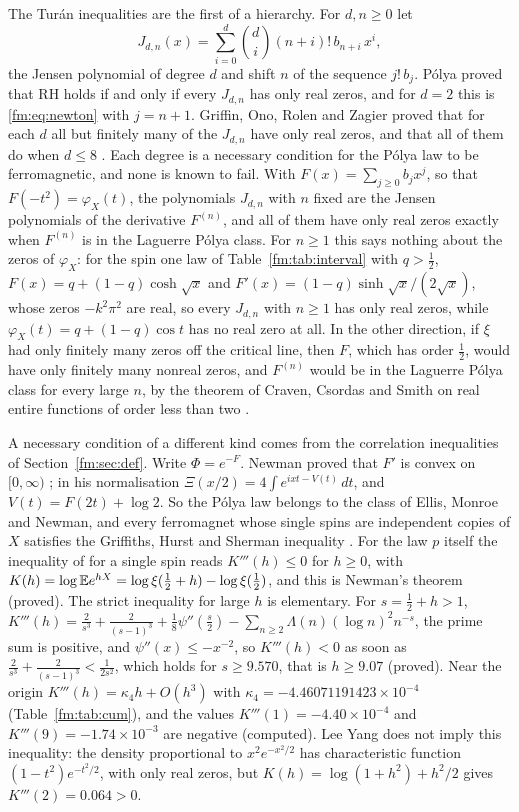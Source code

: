 The Tur\'an inequalities are the first of a hierarchy. For $d,n\ge0$ let
\[
J_{d,n}(x)=\sum_{i=0}^d\binom di(n+i)!\,b_{n+i}\,x^i,
\]
the Jensen polynomial of degree $d$ and shift $n$ of the sequence $j!\,b_j$. P\'olya proved that RH holds if and only if every $J_{d,n}$ has only real zeros, and for $d=2$ this is \eqref{fm:eq:newton} with $j=n+1$. Griffin, Ono, Rolen and Zagier proved that for each $d$ all but finitely many of the $J_{d,n}$ have only real zeros, and that all of them do when $d\le8$ \cite{GORZ19}. Each degree is a necessary condition for the P\'olya law to be ferromagnetic, and none is known to fail. With $F(x)=\sum_{j\ge0}b_jx^j$, so that $F(-t^2)=\varphi_X(t)$, the polynomials $J_{d,n}$ with $n$ fixed are the Jensen polynomials of the derivative $F^{(n)}$, and all of them have only real zeros exactly when $F^{(n)}$ is in the Laguerre P\'olya class. For $n\ge1$ this says nothing about the zeros of $\varphi_X$: for the spin one law of Table~\ref{fm:tab:interval} with $q>\frac12$, $F(x)=q+(1-q)\cosh\sqrt x$ and $F'(x)=(1-q)\sinh\sqrt x/(2\sqrt x)$, whose zeros $-k^2\pi^2$ are real, so every $J_{d,n}$ with $n\ge1$ has only real zeros, while $\varphi_X(t)=q+(1-q)\cos t$ has no real zero at all. In the other direction, if $\xi$ had only finitely many zeros off the critical line, then $F$, which has order $\frac12$, would have only finitely many nonreal zeros, and $F^{(n)}$ would be in the Laguerre P\'olya class for every large $n$, by the theorem of Craven, Csordas and Smith on real entire functions of order less than two \cite{CCS87}.

A necessary condition of a different kind comes from the correlation inequalities of Section~\ref{fm:sec:def}. Write $\Phi=e^{-F}$. Newman proved that $F'$ is convex on $[0,\infty)$ \cite{Newman91}; in his normalisation $\Xi(x/2)=4\int e^{ixt-V(t)}\,dt$, and $V(t)=F(2t)+\log2$. So the P\'olya law belongs to the class of Ellis, Monroe and Newman, and every ferromagnet whose single spins are independent copies of $X$ satisfies the Griffiths, Hurst and Sherman inequality \cite{EMN76}. For the law $p$ itself the inequality of \cite{EMN76} for a single spin reads $K'''(h)\le0$ for $h\ge0$, with $K(h)=\log\mathbb{E} e^{hX}=\log\xi(\frac12+h)-\log\xi(\frac12)$, and this is Newman's theorem \cite{Newman91} (proved). The strict inequality for large $h$ is elementary. For $s=\frac12+h>1$, $K'''(h)=\frac2{s^3}+\frac2{(s-1)^3}+\frac18\psi''(\frac s2)-\sum_{n\ge2}\Lambda(n)(\log n)^2n^{-s}$, the prime sum is positive, and $\psi''(x)\le-x^{-2}$, so $K'''(h)<0$ as soon as $\frac2{s^3}+\frac2{(s-1)^3}<\frac1{2s^2}$, which holds for $s\ge9.570$, that is $h\ge9.07$ (proved). Near the origin $K'''(h)=\kappa_4h+O(h^3)$ with $\kappa_4=-4.46071191423\times10^{-4}$ (Table~\ref{fm:tab:cum}), and the values $K'''(1)=-4.40\times10^{-4}$ and $K'''(9)=-1.74\times10^{-3}$ are negative (computed). Lee Yang does not imply this inequality: the density proportional to $x^2e^{-x^2/2}$ has characteristic function $(1-t^2)e^{-t^2/2}$, with only real zeros, but $K(h)=\log(1+h^2)+h^2/2$ gives $K'''(2)=0.064>0$.

